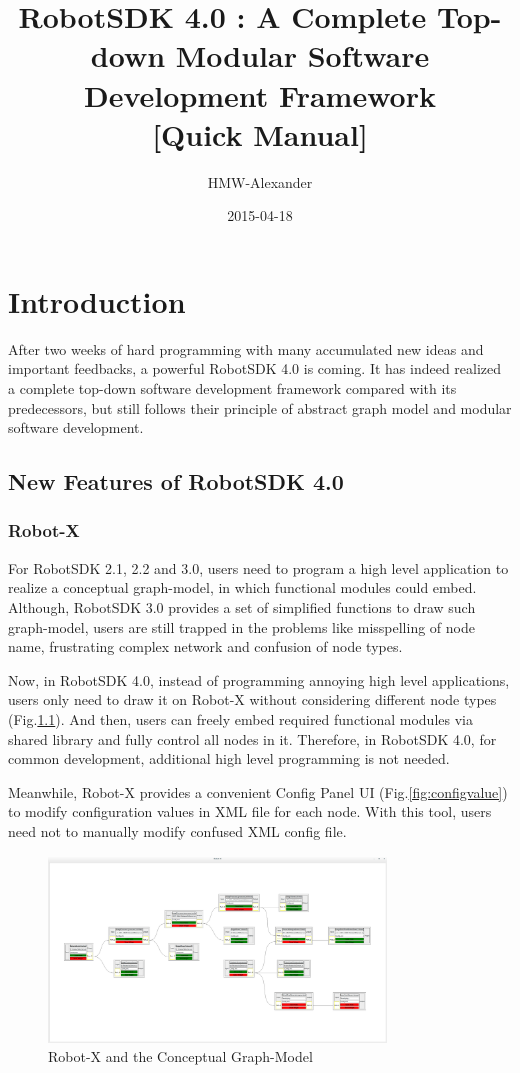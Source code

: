 \documentclass[a4paper,10pt]{book}
\title{{\LARGE\bf{RobotSDK 4.0 : A Complete Top-down Modular Software Development Framework}} \\ {\Large[Quick Manual]}}
\author{HMW-Alexander}
\date{2015-04-18}
\begin{document}
\maketitle
\tableofcontents

\chapter{Introduction}

After two weeks of hard programming with many accumulated new ideas and important feedbacks, a powerful RobotSDK 4.0 is coming.
It has indeed realized a complete top-down software development framework compared with its predecessors, but still follows their principle of abstract graph model and modular software development.

\section{New Features of RobotSDK 4.0}

\subsection{Robot-X}

For RobotSDK 2.1, 2.2 and 3.0, users need to program a high level application to realize a conceptual graph-model, in which functional modules could embed. Although, RobotSDK 3.0 provides a set of simplified functions to draw such graph-model, users are still trapped in the problems like misspelling of node name, frustrating complex network and confusion of node types.

Now, in RobotSDK 4.0, instead of programming annoying high level applications, users only need to draw it on Robot-X without considering different node types (Fig.\ref{fig:robotx}). And then, users can freely embed required functional modules via shared library and fully control all nodes in it. Therefore, in RobotSDK 4.0, for common development, additional high level programming is not needed.

Meanwhile, Robot-X provides a convenient Config Panel UI (Fig.\ref{fig:configvalue}) to modify configuration values in XML file for each node. With this tool, users need not to manually modify confused XML config file.

\begin{figure}
 \centering
 \includegraphics[width=0.8\textwidth]{img/Robot-X.png}
 \caption{Robot-X and the Conceptual Graph-Model}
 \label{fig:robotx}
\end{figure}
\end{document}
